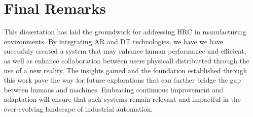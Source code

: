 \section{Final Remarks}

This dissertation has laid the groundwork for addressing \ac{HRC} in manufacturing environments. By integrating AR and DT technologies, we have we have sucessfuly created a system that may enhance human performance and efficient, as well as enhance collaboration between users physicall distributted through the use of a new reality. The insights gained and the foundation established through this work pave the way for future explorations that can further bridge the gap between humans and machines. Embracing continuous improvement and adaptation will ensure that such systems remain relevant and impactful in the ever-evolving landscape of industrial automation.